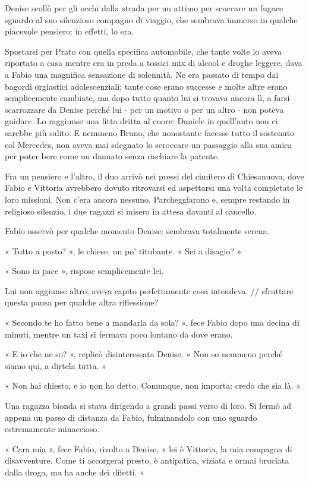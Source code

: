 Denise scollò per gli occhi dalla strada per un attimo per scoccare un fugace sguardo al suo silenzioso compagno di viaggio, che sembrava immerso in qualche piacevole pensiero: in effetti, lo era.

Spostarsi per Prato con quella specifica automobile, che tante volte lo aveva riportato a casa mentre era in preda a tossici mix di alcool e droghe leggere, dava a Fabio una magnifica sensazione di solennità. Ne era passato di tempo dai bagordi orgiastici adolescenziali; tante cose erano successe e molte altre erano semplicemente cambiate, ma dopo tutto quanto lui si trovava ancora lì, a farsi scarrozzare da Denise perché lui - per un motivo o per un altro - non poteva guidare. Lo raggiunse una fitta dritta al cuore: Daniele in quell'auto non ci sarebbe più salito. E nemmeno Bruno, che nonostante facesse tutto il sostenuto col Mercedes, non aveva mai sdegnato lo scroccare un passaggio alla sua amica per poter bere come un dannato senza rischiare la patente.

Fra un pensiero e l'altro, il duo arrivò nei pressi del cimitero di Chiesanuova, dove Fabio e Vittoria avrebbero dovuto ritrovarsi ed aspettarsi una volta completate le loro missioni. Non c'era ancora nessuno. Parcheggiarono e, sempre restando in religioso silenzio, i due ragazzi si misero in attesa davanti al cancello.

Fabio osservò per qualche momento Denise: sembrava totalmente serena.

« Tutto a posto? », le chiese, un po' titubante. « Sei a disagio? »

« Sono in pace », rispose semplicemente lei.

Lui non aggiunse altro; aveva capito perfettamente cosa intendeva.
// sfruttare questa pausa per qualche altra riflessione?

« Secondo te ho fatto bene a mandarla da sola? », fece Fabio dopo una decina di minuti, mentre un taxi si fermava poco lontano da dove erano.

« E io che ne so? », replicò disinteressata Denise. « Non so nemmeno perché siamo qui, a dirtela tutta. »

« Non hai chiesto, e io non ho detto. Comunque, non importa: credo che sia là. »

Una ragazza bionda si stava dirigendo a grandi passi verso di loro. Si fermò ad appena un passo di distanza da Fabio, fulminandolo con uno sguardo estremamente minaccioso.

« Cara mia », fece Fabio, rivolto a Denise, « lei è Vittoria, la mia compagna di disavventure. Come ti accorgerai presto, è antipatica, viziata e ormai bruciata dalla droga, ma ha anche dei difetti. »

